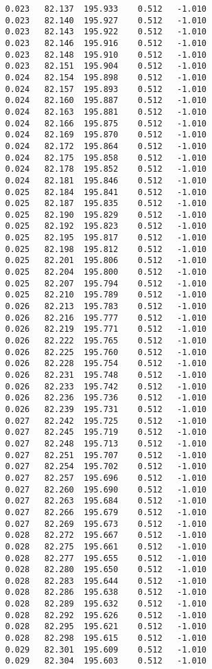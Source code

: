 \begin{verbatim}
   0.023   82.137  195.933    0.512   -1.010
   0.023   82.140  195.927    0.512   -1.010
   0.023   82.143  195.922    0.512   -1.010
   0.023   82.146  195.916    0.512   -1.010
   0.023   82.148  195.910    0.512   -1.010
   0.023   82.151  195.904    0.512   -1.010
   0.024   82.154  195.898    0.512   -1.010
   0.024   82.157  195.893    0.512   -1.010
   0.024   82.160  195.887    0.512   -1.010
   0.024   82.163  195.881    0.512   -1.010
   0.024   82.166  195.875    0.512   -1.010
   0.024   82.169  195.870    0.512   -1.010
   0.024   82.172  195.864    0.512   -1.010
   0.024   82.175  195.858    0.512   -1.010
   0.024   82.178  195.852    0.512   -1.010
   0.024   82.181  195.846    0.512   -1.010
   0.025   82.184  195.841    0.512   -1.010
   0.025   82.187  195.835    0.512   -1.010
   0.025   82.190  195.829    0.512   -1.010
   0.025   82.192  195.823    0.512   -1.010
   0.025   82.195  195.817    0.512   -1.010
   0.025   82.198  195.812    0.512   -1.010
   0.025   82.201  195.806    0.512   -1.010
   0.025   82.204  195.800    0.512   -1.010
   0.025   82.207  195.794    0.512   -1.010
   0.025   82.210  195.789    0.512   -1.010
   0.026   82.213  195.783    0.512   -1.010
   0.026   82.216  195.777    0.512   -1.010
   0.026   82.219  195.771    0.512   -1.010
   0.026   82.222  195.765    0.512   -1.010
   0.026   82.225  195.760    0.512   -1.010
   0.026   82.228  195.754    0.512   -1.010
   0.026   82.231  195.748    0.512   -1.010
   0.026   82.233  195.742    0.512   -1.010
   0.026   82.236  195.736    0.512   -1.010
   0.026   82.239  195.731    0.512   -1.010
   0.027   82.242  195.725    0.512   -1.010
   0.027   82.245  195.719    0.512   -1.010
   0.027   82.248  195.713    0.512   -1.010
   0.027   82.251  195.707    0.512   -1.010
   0.027   82.254  195.702    0.512   -1.010
   0.027   82.257  195.696    0.512   -1.010
   0.027   82.260  195.690    0.512   -1.010
   0.027   82.263  195.684    0.512   -1.010
   0.027   82.266  195.679    0.512   -1.010
   0.027   82.269  195.673    0.512   -1.010
   0.028   82.272  195.667    0.512   -1.010
   0.028   82.275  195.661    0.512   -1.010
   0.028   82.277  195.655    0.512   -1.010
   0.028   82.280  195.650    0.512   -1.010
   0.028   82.283  195.644    0.512   -1.010
   0.028   82.286  195.638    0.512   -1.010
   0.028   82.289  195.632    0.512   -1.010
   0.028   82.292  195.626    0.512   -1.010
   0.028   82.295  195.621    0.512   -1.010
   0.028   82.298  195.615    0.512   -1.010
   0.029   82.301  195.609    0.512   -1.010
   0.029   82.304  195.603    0.512   -1.010

\end{verbatim}
